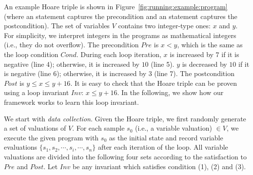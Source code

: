\begin{example}
An example Hoare triple is shown in Figure~\ref{fig:running:example:program} (where an  statement captures the precondition and an  statement captures the postcondition). The set of variables $V$ contains two integer-type ones: $x$ and $y$. For simplicity, we interpret integers in the programs as mathematical integers (i.e., they do not overflow). The precondition $\mathit{Pre}$ is $x < y$, which is the same as the loop condition $\mathit{Cond}$.
During each loop iteration, $x$ is increased by $7$ if it is negative (line 4); otherwise, it is increased by $10$ (line 5). $y$ is decreased by $10$ if it is negative (line 6); otherwise, it is increased by $3$ (line 7). 
The postcondition $\mathit{Post}$ is $y \le x \le y + 16$. 
It is easy to check that the Hoare triple can be proven using a loop invariant $\mathit{Inv}$: $x \le y + 16$. 
In the following, we show how our framework works to learn this loop invariant.
\end{example}
We start with \emph{data collection}. Given the Hoare triple, we first randomly generate a set of valuations of $V$. 
For each sample $s_0$ (i.e., a variable valuation) $\in V$, we execute the given program with $s_0$ as the initial state and record variable evaluations $\{s_1, s_2, \cdots, s_i, \cdots, s_n\}$ after each iteration of the loop. 
All variable valuations are divided into the following four sets according to the satisfaction to $\mathit{Pre}$ and $\mathit{Post}$.
Let $\mathit{Inv}$ be any invariant which satisfies condition (1), (2) and (3). 
